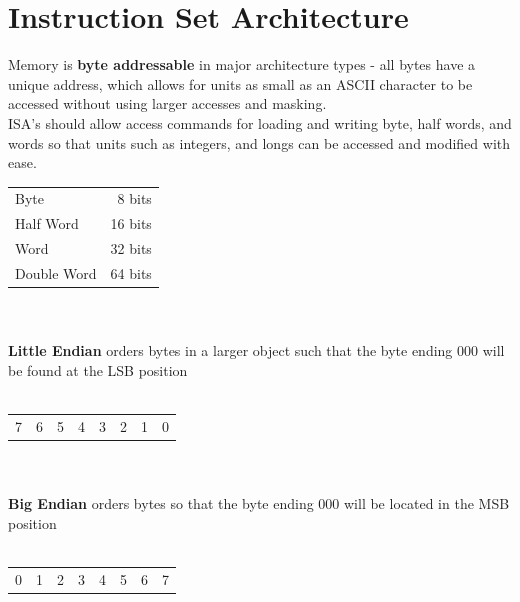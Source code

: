 \documentclass[11pt]{article}
\begin{document}
\section{Instruction Set Architecture}

Memory is \textbf{byte addressable} in major architecture types - all bytes have a unique address, which allows for units as small as an ASCII character to be accessed without using larger accesses and masking. \\

ISA's should allow access commands for loading and writing byte, half words, and words so that units such as integers, and longs can be accessed and modified with ease. \\

\begin{tabular}{ l r}
    Byte & 8 bits \\ 
    Half Word & 16 bits \\
    Word & 32 bits \\
    Double Word & 64 bits
\end{tabular}
\\ \\
\textbf{Little Endian} orders bytes in a larger object such that the byte ending 000 will be found at the LSB position \\ \\
    \begin{tabular}{ c c c c c c c c }
        7 & 6 & 5 & 4 & 3 & 2 & 1 & 0
    \end{tabular} \\ \\ 
\textbf{Big Endian} orders bytes so that the byte ending 000 will be located in the MSB position \\ \\
    \begin{tabular}{ c c c c c c c c }
        0 & 1 & 2 & 3 & 4 & 5 & 6 & 7
    \end{tabular} \\ \\ 
    
\end{document}
